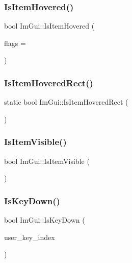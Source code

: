 \subsubsection{\texorpdfstring{Is\+Item\+Hovered()}{IsItemHovered()}}
{\footnotesize\ttfamily bool Im\+Gui\+::\+Is\+Item\+Hovered (\begin{DoxyParamCaption}\item[{Im\+Gui\+Hovered\+Flags}]{flags = {} }\end{DoxyParamCaption})}

\hypertarget{namespace_im_gui_a3be4bc9167af21ffe603bce68c94b947}{}\label{namespace_im_gui_a3be4bc9167af21ffe603bce68c94b947} 
\subsubsection{\texorpdfstring{Is\+Item\+Hovered\+Rect()}{IsItemHoveredRect()}}
{\footnotesize\ttfamily static bool Im\+Gui\+::\+Is\+Item\+Hovered\+Rect (\begin{DoxyParamCaption}{ }\end{DoxyParamCaption})\hspace{0.3cm}{\ttfamily [static]}}

\hypertarget{namespace_im_gui_a0e9273fc53bdf7ca39d59cdb657c3c2f}{}\label{namespace_im_gui_a0e9273fc53bdf7ca39d59cdb657c3c2f} 
\subsubsection{\texorpdfstring{Is\+Item\+Visible()}{IsItemVisible()}}
{\footnotesize\ttfamily bool Im\+Gui\+::\+Is\+Item\+Visible (\begin{DoxyParamCaption}{ }\end{DoxyParamCaption})}

\hypertarget{namespace_im_gui_a633d848504c89e7756ddd33474bc78d2}{}\label{namespace_im_gui_a633d848504c89e7756ddd33474bc78d2} 
\subsubsection{\texorpdfstring{Is\+Key\+Down()}{IsKeyDown()}}
{\footnotesize\ttfamily bool Im\+Gui\+::\+Is\+Key\+Down (\begin{DoxyParamCaption}\item[{int}]{user\+\_\+key\+\_\+index }\end{DoxyParamCaption})}

